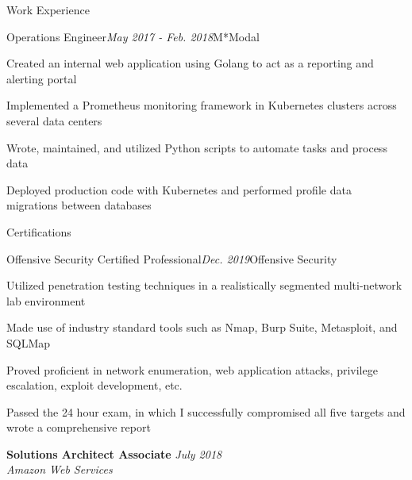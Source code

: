 \documentclass{resume} %
\begin{document}
\begin{rSection}{\vspace{-5pt}Work Experience}

\begin{rSubsection}{Operations Engineer}{\em May 2017 - Feb. 2018}{M*Modal}{}
\item {Created an internal web application using Golang to act as a reporting and alerting portal}
\item {Implemented a Prometheus monitoring framework in Kubernetes clusters across several data centers}
\item {Wrote, maintained, and utilized Python scripts to automate tasks and process data}
\item {Deployed production code with Kubernetes and performed profile data migrations between databases}
\end{rSubsection}

\end{rSection}

\begin{rSection}{\vspace{-5pt}Certifications}
  \begin{rSubsection}{Offensive Security Certified Professional}{\em Dec. 2019}{Offensive Security}{}
  \item {Utilized penetration testing techniques in a realistically segmented multi-network lab environment}
  \item {Made use of industry standard tools such as Nmap, Burp Suite, Metasploit, and SQLMap }
  \item {Proved proficient in network enumeration, web application attacks, privilege escalation, exploit development, etc.}
  \item {Passed the 24 hour exam, in which I successfully compromised all five targets and wrote a comprehensive report}
  \end{rSubsection}
  {\bf Solutions Architect Associate} \hfill {\em July 2018} 
  \\ \textit{Amazon Web Services}
\end{rSection}
\end{document}
